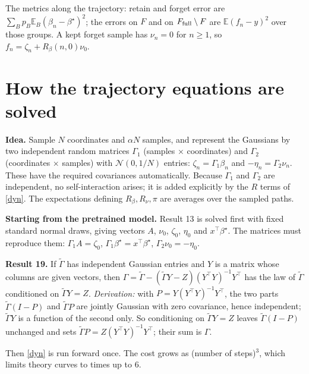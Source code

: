 \documentclass[10pt]{article}
\newcommand{\bs}{\beta^\star}\newcommand{\E}{\mathbb E}\newcommand{\asinh}{\operatorname{arcsinh}}\newcommand{\sk}{\sqrt k}
\begin{document}
The metrics along the trajectory: retain and forget error are $\sum_Bp_B\E_B(\beta_n-\bs)^2$; the errors on $F$ and on $F_{\rm full}\setminus F$ are $\E(f_n-y)^2$ over those groups. A kept forget sample has $\nu_n=0$ for $n\ge1$, so $f_n=\zeta_n+R_\beta(n,0)\nu_0$.

\section{How the trajectory equations are solved}
\textbf{Idea.} Sample $N$ coordinates and $\alpha N$ samples, and represent the Gaussians by two independent random matrices $\Gamma_1$ (samples $\times$ coordinates) and $\Gamma_2$ (coordinates $\times$ samples) with $\mathcal N(0,1/N)$ entries: $\zeta_n=\Gamma_1\beta_n$ and $-\eta_n=\Gamma_2\nu_n$. These have the required covariances automatically. Because $\Gamma_1$ and $\Gamma_2$ are independent, no self-interaction arises; it is added explicitly by the $R$ terms of \eqref{dyn}. The expectations defining $R_\beta,R_\nu,\pi$ are averages over the sampled paths.

\textbf{Starting from the pretrained model.} Result 13 is solved first with fixed standard normal draws, giving vectors $A$, $\nu_0$, $\zeta_0$, $\eta_0$ and $x^\top\bs$. The matrices must reproduce them: $\Gamma_1A=\zeta_0$, $\Gamma_1\bs=x^\top\bs$, $\Gamma_2\nu_0=-\eta_0$.

\textbf{Result 19.} If $\tilde\Gamma$ has independent Gaussian entries and $Y$ is a matrix whose columns are given vectors, then $\Gamma=\tilde\Gamma-(\tilde\Gamma Y-Z)(Y^\top Y)^{-1}Y^\top$ has the law of $\tilde\Gamma$ conditioned on $\tilde\Gamma Y=Z$. \emph{Derivation:} with $P=Y(Y^\top Y)^{-1}Y^\top$, the two parts $\tilde\Gamma(I-P)$ and $\tilde\Gamma P$ are jointly Gaussian with zero covariance, hence independent; $\tilde\Gamma Y$ is a function of the second only. So conditioning on $\tilde\Gamma Y=Z$ leaves $\tilde\Gamma(I-P)$ unchanged and sets $\tilde\Gamma P=Z(Y^\top Y)^{-1}Y^\top$; their sum is $\Gamma$.

Then \eqref{dyn} is run forward once. The cost grows as (number of steps)$^3$, which limits theory curves to times up to $6$.
\end{document}
